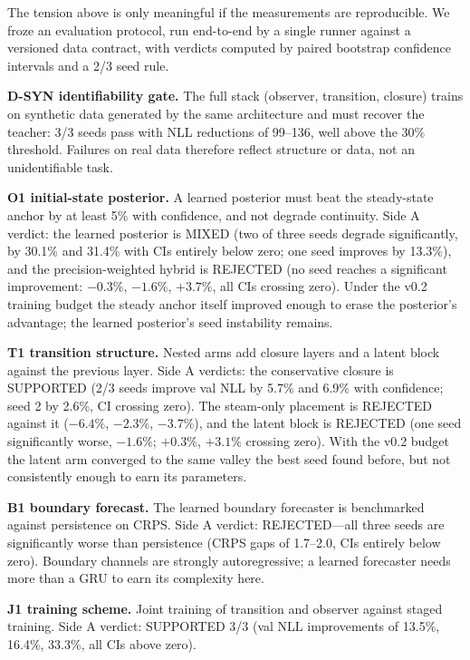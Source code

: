 \documentclass{article}
\begin{document}
The tension above is only meaningful if the measurements are reproducible. We froze an
evaluation protocol, run end-to-end by a single runner against a versioned data
contract, with verdicts computed by paired bootstrap confidence intervals and a 2/3
seed rule.

\textbf{D-SYN identifiability gate.} The full stack (observer, transition, closure)
trains on synthetic data generated by the same architecture and must recover the
teacher: 3/3 seeds pass with NLL reductions of 99--136, well above the 30\% threshold.
Failures on real data therefore reflect structure or data, not an unidentifiable task.

\textbf{O1 initial-state posterior.} A learned posterior must beat the steady-state
anchor by at least 5\% with confidence, and not degrade continuity. Side A verdict:
the learned posterior is MIXED (two of three seeds degrade significantly, by 30.1\%
and 31.4\% with CIs entirely below zero; one seed improves by 13.3\%), and the
precision-weighted hybrid is REJECTED (no seed reaches a
significant improvement: $-0.3\%$, $-1.6\%$, $+3.7\%$, all CIs crossing zero). Under
the v0.2 training budget the steady anchor itself improved enough to erase the
posterior's advantage; the learned posterior's seed instability remains.

\textbf{T1 transition structure.} Nested arms add closure layers and a latent block
against the previous layer. Side A verdicts: the conservative closure is SUPPORTED
(2/3 seeds improve val NLL by 5.7\% and 6.9\% with confidence; seed 2 by 2.6\%,
CI crossing zero). The steam-only placement is REJECTED against it ($-6.4\%$,
$-2.3\%$, $-3.7\%$), and the latent block is REJECTED (one seed significantly worse,
$-1.6\%$; $+0.3\%$, $+3.1\%$ crossing zero). With the v0.2 budget the latent arm
converged to the same valley the best seed found before, but not consistently enough
to earn its parameters.

\textbf{B1 boundary forecast.} The learned boundary forecaster is benchmarked against
persistence on CRPS. Side A verdict: REJECTED---all three seeds are significantly
worse than persistence (CRPS gaps of 1.7--2.0, CIs entirely below zero). Boundary
channels are strongly autoregressive; a learned forecaster needs more than a GRU to
earn its complexity here.

\textbf{J1 training scheme.} Joint training of transition and observer against staged
training. Side A verdict: SUPPORTED 3/3 (val NLL improvements of 13.5\%, 16.4\%,
33.3\%, all CIs above zero).
\end{document}
